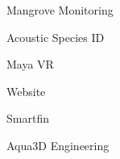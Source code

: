 \item Mangrove Monitoring
\item Acoustic Species ID
\item Maya VR
\item Website
\item Smartfin
\item Aqua3D Engineering
